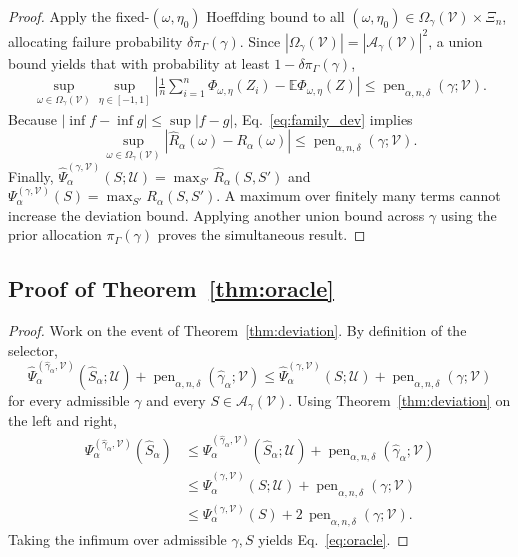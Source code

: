 \documentclass{article}
\newcommand{\EE}{\mathbb{E}}
\newcommand{\cA}{\mathcal{A}}
\newcommand{\cU}{\mathcal{U}}
\newcommand{\cV}{\mathcal{V}}
\newcommand{\1}{\mathbbm{1}}
\begin{document}
\begin{proof}
Apply the fixed-\((\omega,\eta_0)\) Hoeffding bound to all \((\omega,\eta_0)\in \Omega_\gamma(\cV)\times\Xi_n\), allocating failure probability \(\delta \pi_\Gamma(\gamma)\). Since \(|\Omega_\gamma(\cV)|=|\cA_\gamma(\cV)|^2\), a union bound yields that with probability at least \(1-\delta\pi_\Gamma(\gamma)\),
\begin{align}
    \sup_{\omega\in\Omega_\gamma(\cV)}
    \sup_{\eta\in[-1,1]}
    \left|
        \frac{1}{n}\sum_{i=1}^{n}\Phi_{\omega,\eta}(Z_i)
        -
        \EE\Phi_{\omega,\eta}(Z)
    \right|
    \le
    \operatorname{pen}_{\alpha,n,\delta}(\gamma;\cV).
    \label{eq:family_dev}
\end{align}
Because \(|\inf f - \inf g|\le \sup |f-g|\), Eq.~\eqref{eq:family_dev} implies
\[
    \sup_{\omega\in\Omega_\gamma(\cV)}
    \left|
        \widehat{R}_\alpha(\omega) - R_\alpha(\omega)
    \right|
    \le
    \operatorname{pen}_{\alpha,n,\delta}(\gamma;\cV).
\]
Finally, \(\widehat{\Psi}^{(\gamma,\cV)}_\alpha(S;\cU)=\max_{S'}\widehat{R}_\alpha(S,S')\) and \(\Psi^{(\gamma,\cV)}_\alpha(S)=\max_{S'}R_\alpha(S,S')\). A maximum over finitely many terms cannot increase the deviation bound. Applying another union bound across \(\gamma\) using the prior allocation \(\pi_\Gamma(\gamma)\) proves the simultaneous result.
\end{proof}

\subsection{Proof of Theorem~\ref{thm:oracle}}

\begin{proof}
Work on the event of Theorem~\ref{thm:deviation}. By definition of the selector,
\[
    \widehat{\Psi}^{(\widehat{\gamma}_\alpha,\cV)}_\alpha(\widehat{S}_\alpha;\cU)
    +
    \operatorname{pen}_{\alpha,n,\delta}(\widehat{\gamma}_\alpha;\cV)
    \le
    \widehat{\Psi}^{(\gamma,\cV)}_\alpha(S;\cU)
    +
    \operatorname{pen}_{\alpha,n,\delta}(\gamma;\cV)
\]
for every admissible \(\gamma\) and every \(S\in\cA_\gamma(\cV)\). Using Theorem~\ref{thm:deviation} on the left and right,
\begin{align*}
    \Psi^{(\widehat{\gamma}_\alpha,\cV)}_\alpha(\widehat{S}_\alpha)
    &\le
    \widehat{\Psi}^{(\widehat{\gamma}_\alpha,\cV)}_\alpha(\widehat{S}_\alpha;\cU)
    +
    \operatorname{pen}_{\alpha,n,\delta}(\widehat{\gamma}_\alpha;\cV)
    \\
    &\le
    \widehat{\Psi}^{(\gamma,\cV)}_\alpha(S;\cU)
    +
    \operatorname{pen}_{\alpha,n,\delta}(\gamma;\cV)
    \\
    &\le
    \Psi^{(\gamma,\cV)}_\alpha(S)
    +
    2\,\operatorname{pen}_{\alpha,n,\delta}(\gamma;\cV).
 \end{align*}
Taking the infimum over admissible \(\gamma,S\) yields Eq.~\eqref{eq:oracle}.
\end{proof}
\end{document}
